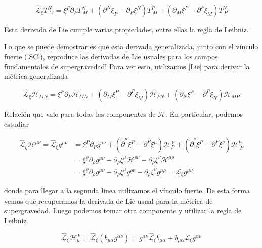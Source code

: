 \documentclass{article}
\numberwithin{equation}{section}
\begin{document}
\begin{equation}\label{Lie}
\hat{\mathcal{L}}_{\xi} T^N_{\ M} = \xi^P\partial_P T^N_{\ M} + \left(\partial^N \xi_P - \partial_P\xi^N\right)T^P_{\ M} + \left(\partial_M \xi^P - \partial^P\xi_M\right)T^N_{\ P}
\end{equation}

Esta derivada de Lie cumple varias propiedades, entre ellas la regla de Leibniz.

Lo que se puede demostrar es que esta derivada generalizada, junto con el vínculo fuerte (\ref{SC}), reproduce las derivadas de Lie usuales para los campos fundamentales de supergravedad! Para ver esto, utilizamos \ref{Lie} para derivar la métrica generalizada


\begin{equation}\label{key}
\hat{\mathcal{L}}_{\xi} \mathcal{H}_{MN} = \xi^P\partial_P \mathcal{H}_{MN} + \left(\partial_M \xi^P - \partial^P\xi_M\right)\mathcal{H}_{PN} + \left(\partial_N \xi^P - \partial^P\xi_N\right)\mathcal{H}_{MP}
\end{equation}

Relación que vale para todas las componentes de $ \pmb{\mathcal{H}} $. En particular, podemos estudiar

\begin{equation}\label{key}
\begin{aligned}
\hat{\mathcal{L}}_{\xi} \mathcal{H}^{\mu\nu}= \hat{\mathcal{L}}_{\xi} g^{\mu\nu} &= \xi^P\partial_P g^{\mu\nu} + \left(\widetilde{\partial}^{\mu} \xi^P - \partial^P\xi^{\mu}\right)\mathcal{H}_P^{\ \nu} + \left(\widetilde{\partial}^{\nu} \xi^P - \partial^P\xi^{\nu}\right)\mathcal{H}^{\mu}_{\ P}\\
&= \xi^{\rho}\partial_{\rho} g^{\mu\nu} - \partial_{\rho}\xi^{\mu}\mathcal{H}^{\rho\nu} -\partial_{\rho}\xi^{\nu}\mathcal{H}^{\mu\rho}\\
&=\xi^{\rho}\partial_{\rho} g^{\mu\nu} - \partial_{\rho}\xi^{\mu}g^{\rho\nu} -\partial_{\rho}\xi^{\nu}g^{\mu\rho} = \mathcal{L}_{\xi}g^{\mu\nu}
\end{aligned}
\end{equation}

donde para llegar a la segunda linea utilizamos el vínculo fuerte. De esta forma vemos que recuperamos la derivada de Lie usual para la métrica de supergravedad. Luego podemos tomar otra componente y utilizar la regla de Leibniz

\begin{equation}\label{segundacomponente}
\hat{\mathcal{L}}_{\xi} \mathcal{H}_{\mu}^{\ \nu} = \hat{\mathcal{L}}_{\xi} \left(b_{\mu\alpha}g^{\alpha\nu}\right) =  g^{\alpha \nu}  \hat{\mathcal{L}}_{\xi} b_{\mu\alpha} + b_{\mu\alpha} \mathcal{L}_{\xi} g^{\alpha \nu} 
\end{equation}
\end{document}
